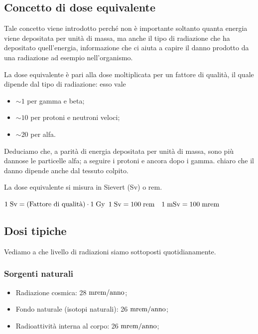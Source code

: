 \subsection{Concetto di dose equivalente}
Tale concetto viene introdotto perché non è importante soltanto quanta energia viene depositata per unità di massa, ma anche il tipo di radiazione che ha depositato quell'energia, informazione che ci aiuta a capire il danno prodotto da una radiazione ad esempio nell'organismo.

La dose equivalente è pari alla dose moltiplicata per un fattore di qualità, il quale dipende dal tipo di radiazione: esso vale
\begin{itemize}[leftmargin=0.5cm]
    \item $\sim 1$ per gamma e beta;
    \item $\sim 10$ per protoni e neutroni veloci;
    \item $\sim 20$ per alfa.
\end{itemize}
Deduciamo che, a parità di energia depositata per unità di massa, sono più dannose le particelle alfa; a seguire i protoni e ancora dopo i gamma. \E chiaro che il danno dipende anche dal tessuto colpito.

La dose equivalente si misura in Sievert (Sv) o rem.

$\rm 1 \; Sv=(\text{Fattore di qualità}) \cdot 1 \; Gy$
$\rm 1 \; Sv=100 \; rem \quad 1 \; mSv=100 \; mrem$

\subsection{Dosi tipiche}

Vediamo a che livello di radiazioni siamo sottoposti quotidianamente.

\subsubsection{Sorgenti naturali}

\begin{itemize}[leftmargin=0.5cm]
    \item Radiazione cosmica: 28 $\rm mrem/anno$;
    \item Fondo naturale (isotopi naturali): 26 $\rm mrem/anno$;
    \item Radioattività interna al corpo\footnotemark: 26 $\rm mrem/anno$;
\end{itemize}


